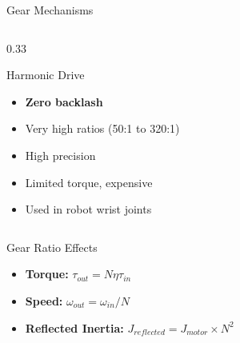 \documentclass[10pt]{beamer}
\begin{document}
\begin{frame}{Gear Mechanisms}
\begin{columns}
		\begin{column}{0.33\textwidth}
			\begin{block}{Harmonic Drive}
				\begin{center}
				\end{center}
				\begin{itemize}
					\footnotesize
					\item \textbf{Zero backlash}
					\item Very high ratios (50:1 to 320:1)
					\item High precision
					\item Limited torque, expensive
					\item Used in robot wrist joints
				\end{itemize}
			\end{block}
		\end{column}
	\end{columns}
	
	\vspace{3mm}
	\begin{alertblock}{Gear Ratio Effects}
		\begin{itemize}
			\item \textbf{Torque:} $\tau_{out} = N \eta \tau_{in}$
			\item \textbf{Speed:} $\omega_{out} = \omega_{in}/N$
			\item \textbf{Reflected Inertia:} $J_{reflected} = J_{motor} \times N^2$
		\end{itemize}
	\end{alertblock}
\end{frame}
\end{document}
